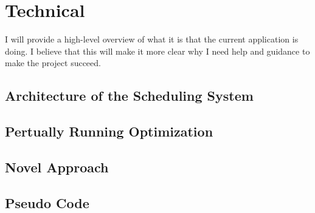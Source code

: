 \section*{Technical}
\label{sec:technical}

I will provide a high-level overview of what it is that the current application is doing. I believe that 
this will make it more clear why I need help and guidance to make the project succeed.

\subsection*{Architecture of the Scheduling System}



\subsection*{Pertually Running Optimization}


\subsection*{Novel Approach}


\drawModelSetupHexagon

\subsection*{Pseudo Code}
\begin{figure}

\end{figure}
